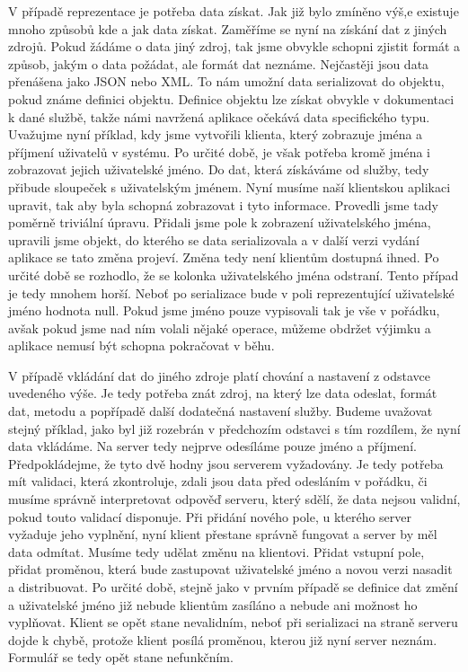 V případě reprezentace je potřeba data získat. Jak již bylo zmíněno výš,e existuje mnoho způsobů kde a jak data získat. Zaměříme se nyní na získání dat z jiných zdrojů. Pokud žádáme o data jiný zdroj, tak jsme obvykle schopni zjistit formát a způsob, jakým o data požádat, ale formát dat neznáme. Nejčastěji jsou data přenášena jako JSON \cite{javaEE} nebo XML. To nám umožní data serializovat do objektu, pokud známe definici objektu. Definice objektu lze získat obvykle v dokumentaci k dané službě, takže námi navržená aplikace očekává data specifického typu. Uvažujme nyní příklad, kdy jsme vytvořili klienta, který zobrazuje jména a příjmení uživatelů v systému. Po určité době, je však potřeba kromě jména i zobrazovat jejich uživatelské jméno. Do dat, která získáváme od služby, tedy přibude sloupeček s uživatelským jménem. Nyní musíme naší klientskou aplikaci upravit, tak aby byla schopná zobrazovat i tyto informace. Provedli jsme tady poměrně triviální úpravu. Přidali jsme pole k zobrazení uživatelského jména, upravili jsme objekt, do kterého se data serializovala a v další verzi vydání aplikace se tato změna projeví. Změna tedy není klientům dostupná ihned. Po určité době se rozhodlo, že se kolonka uživatelského jména odstraní. Tento případ je tedy mnohem horší. Neboť po serializace bude v poli reprezentující uživatelské jméno hodnota null. Pokud jsme jméno pouze vypisovali tak je vše v pořádku, avšak pokud jsme nad ním volali nějaké operace, můžeme obdržet výjimku a aplikace nemusí být schopna pokračovat v běhu.

V případě vkládání dat do jiného zdroje platí chování a nastavení z odstavce uvedeného výše. Je tedy potřeba znát zdroj, na který lze data odeslat, formát dat, metodu a popřípadě další dodatečná nastavení služby. Budeme uvažovat stejný příklad, jako byl již rozebrán v předchozím odstavci s tím rozdílem, že nyní data vkládáme. Na server tedy nejprve odesíláme pouze jméno a příjmení. Předpokládejme, že tyto dvě hodny jsou serverem vyžadovány. Je tedy potřeba mít validaci, která zkontroluje, zdali jsou data před odesláním v pořádku, či musíme správně interpretovat odpověď serveru, který sdělí, že data nejsou validní, pokud touto validací disponuje. Při přidání nového pole, u kterého server vyžaduje jeho vyplnění, nyní klient přestane správně fungovat a server by měl data odmítat. Musíme tedy udělat změnu na klientovi. Přidat vstupní pole, přidat proměnou, která bude zastupovat uživatelské jméno a novou verzi nasadit a distribuovat. Po určité době, stejně jako v prvním případě se definice dat změní a uživatelské jméno již nebude klientům zasíláno a nebude ani možnost ho vyplňovat. Klient se opět stane nevalidním, neboť při serializaci na straně serveru dojde k chybě, protože klient posílá proměnou, kterou již nyní server neznám. Formulář se tedy opět stane nefunkčním.
